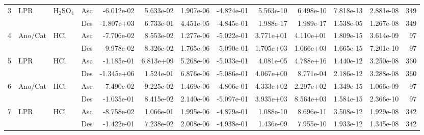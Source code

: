 \begin{tabular}{llllrrrrrrrrr}
3 & LPR & H$_2$SO$_4$ & Asc &          -6.012e-02 &            5.633e-02 &                     1.907e-06 &                       -4.824e-01 &                 5.563e-10 &                  6.498e-10 &                    7.818e-13 &                              2.881e-08 &  349 \\
  &     &     & Des &          -1.807e+03 &            6.733e-01 &                     4.451e-05 &                       -4.845e-01 &                 1.988e-17 &                  1.989e-17 &                    1.538e-05 &                              1.267e-08 &  349 \\
4 & Ano/Cat & HCl & Asc &          -7.706e-02 &            8.553e-02 &                     1.277e-06 &                       -5.022e-01 &                 3.771e+01 &                  4.110e+01 &                    1.809e-15 &                              3.614e-09 &   97 \\
  &     &     & Des &          -9.978e-02 &            8.326e-02 &                     1.765e-06 &                       -5.090e-01 &                 1.705e+03 &                  1.066e+03 &                    1.665e-15 &                              7.201e-10 &   97 \\
5 & LPR & HCl & Asc &          -1.185e-01 &            6.813e+09 &                     5.268e-06 &                       -5.033e-01 &                 4.081e-05 &                  4.788e+16 &                    1.440e-12 &                              3.250e-08 &  360 \\
  &     &     & Des &          -1.345e+06 &            1.524e-01 &                     6.876e-06 &                       -5.086e-01 &                 4.067e+00 &                  8.771e-04 &                    2.186e-12 &                              3.288e-08 &  360 \\
6 & Ano/Cat & HCl & Asc &          -7.490e-02 &            9.225e-02 &                     1.469e-06 &                       -4.806e-01 &                 4.333e+02 &                  2.297e+02 &                    1.349e-15 &                              1.066e-09 &   97 \\
  &     &     & Des &          -1.035e-01 &            8.415e-02 &                     2.140e-06 &                       -5.097e-01 &                 3.935e+03 &                  8.564e+03 &                    1.584e-15 &                              2.366e-10 &   97 \\
7 & LPR & HCl & Asc &          -8.758e-02 &            1.066e-01 &                     1.995e-06 &                       -4.879e-01 &                 1.088e-10 &                  8.696e-11 &                    3.508e-12 &                              1.929e-08 &  342 \\
  &     &     & Des &          -1.422e-01 &            7.238e-02 &                     2.008e-06 &                       -4.938e-01 &                 1.436e-09 &                  7.955e-10 &                    1.933e-12 &                              1.345e-08 &  342 \\
\bottomrule
\end{tabular}
